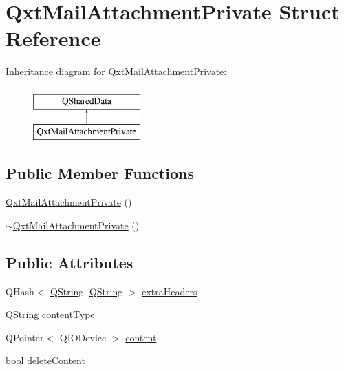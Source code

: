 \hypertarget{struct_qxt_mail_attachment_private}{\section{Qxt\-Mail\-Attachment\-Private Struct Reference}
\label{struct_qxt_mail_attachment_private}
}
Inheritance diagram for Qxt\-Mail\-Attachment\-Private\-:\begin{figure}[H]
\begin{center}
\leavevmode
\includegraphics[height=2.000000cm]{struct_qxt_mail_attachment_private}
\end{center}
\end{figure}
\subsection*{Public Member Functions}
\begin{DoxyCompactItemize}
\item 
\hyperlink{struct_qxt_mail_attachment_private_ab4de8e1bd7be723811baa814713adaa9}{Qxt\-Mail\-Attachment\-Private} ()
\item 
\hyperlink{struct_qxt_mail_attachment_private_ac16081ad6f1f05af26403172df2e46d4}{$\sim$\-Qxt\-Mail\-Attachment\-Private} ()
\end{DoxyCompactItemize}
\subsection*{Public Attributes}
\begin{DoxyCompactItemize}
\item 
Q\-Hash$<$ \hyperlink{group___u_a_v_objects_plugin_gab9d252f49c333c94a72f97ce3105a32d}{Q\-String}, \hyperlink{group___u_a_v_objects_plugin_gab9d252f49c333c94a72f97ce3105a32d}{Q\-String} $>$ \hyperlink{struct_qxt_mail_attachment_private_a6f02f1af9bb2febc6835a5ab554e9f4f}{extra\-Headers}
\item 
\hyperlink{group___u_a_v_objects_plugin_gab9d252f49c333c94a72f97ce3105a32d}{Q\-String} \hyperlink{struct_qxt_mail_attachment_private_a3a5899f0d5e13077c2cec7945f60f3e2}{content\-Type}
\item 
Q\-Pointer$<$ Q\-I\-O\-Device $>$ \hyperlink{struct_qxt_mail_attachment_private_a9466a4671c5998d80beb2b101f5aab1b}{content}
\item 
bool \hyperlink{struct_qxt_mail_attachment_private_ac02c6d5f9385b472ae9065a028cfbdb3}{delete\-Content}
\end{DoxyCompactItemize}


